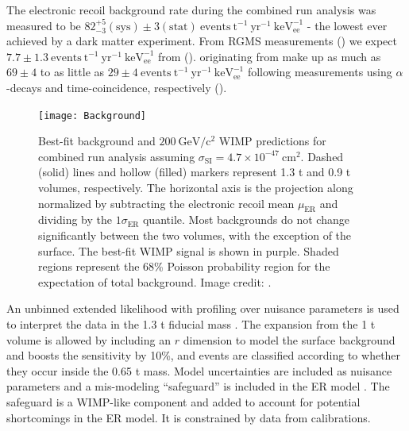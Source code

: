 The electronic recoil background rate during the combined run analysis was measured to be
$82_{-3}^{+5} (\mathrm{sys}) \pm 3 (\mathrm{stat})\ \mathrm{events\ t^{-1}\ yr^{-1}\ keV_{ee}^{-1}}$ - the lowest ever achieved by a dark
matter experiment.  From RGMS measurements () we expect
$7.7 \pm 1.3\ \mathrm{events\ t^{-1}\ yr^{-1}\ keV_{ee}^{-1}}$ from  
().  \betadecays originating from  make up as much as $69 \pm 4$ to as
little as $29 \pm 4\ \mathrm{events\ t^{-1}\ yr^{-1}\ keV_{ee}^{-1}}$ following measurements using  $\alpha$-decays and
 time-coincidence, respectively ().

\begin{figure}
\centering
\texttt{[image: Background]}
\caption[Best-fit background and $200\ \mathrm{GeV/c^2}$ WIMP predictions for combined run analysis assuming
$\sigma_{\mathrm{SI}} = 4.7 \times 10^{-47}\ \mathrm{cm^2}$.]{Best-fit background and $200\ \mathrm{GeV/c^2}$ WIMP predictions for combined
run analysis assuming
$\sigma_{\mathrm{SI}} = 4.7 \times 10^{-47}\ \mathrm{cm^2}$.  Dashed (solid) lines and hollow (filled)
markers represent 1.3 t and 0.9 t volumes, respectively.  The horizontal axis is the projection along \cstwob normalized by subtracting
the electronic recoil mean $\mu_{\mathrm{ER}}$ and dividing by the $1 \sigma_{\mathrm{ER}}$ quantile.  Most backgrounds do not change
significantly between the two volumes, with the exception of the surface.  The best-fit WIMP signal is shown in purple.  Shaded regions
represent the 68\% Poisson probability region for the expectation of total background.  Image credit: .}
\label{fig:dark_matter_results_background}
\end{figure}

An unbinned extended likelihood with profiling over nuisance parameters is used to interpret the data in the 1.3 t fiducial mass
.  The expansion from the 1 t volume is allowed by including an $r$ dimension to model the surface
background and boosts the sensitivity by 10\%, and events are classified according to whether they occur inside the 0.65 t
mass.  Model uncertainties are included as nuisance parameters and a mis-modeling ``safeguard'' is included in the ER model
.  The
safeguard is a WIMP-like component and added to account for potential shortcomings in the ER model.  It is constrained by data from
 calibrations.

